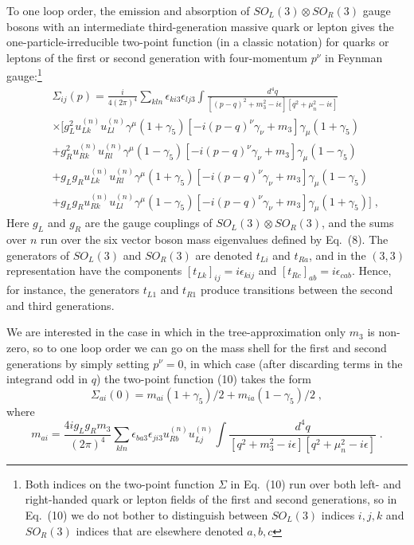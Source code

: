 To one loop order, the emission and absorption of $SO_L(3)\otimes  SO_R(3)$ gauge bosons with an intermediate third-generation massive quark or lepton  gives the one-particle-irreducible  two-point function (in a classic notation) for quarks or leptons of the first or second generation with four-momentum $p^\nu$ in Feynman gauge:\footnote{Both indices on the two-point function $\Sigma$ in Eq.~(10) run over both left- and right-handed quark or lepton fields of the first and second generations, so in Eq.~(10) we do not bother to distinguish between  $SO_L(3)$  indices $i,j,k$ and $SO_R(3)$ indices that are elsewhere denoted $a, b, c$} 
\begin{eqnarray}
&& \Sigma_{ij}(p)=\frac{i}{4(2\pi)^4}\sum_{kln}\epsilon_{ki3}\epsilon_{lj3} \int \frac{d^4q}{[(p-q)^2+m_3^2-i\epsilon][q^2+\mu_n^2-i\epsilon]}\nonumber\\
&& \times \Bigg[g_L^2 u_{Lk}^{(n)}u_{Ll}^{(n)}\gamma^\mu (1+\gamma_5)[-i(p-q)^\nu\gamma_\nu+m_3]\gamma_\mu (1+\gamma_5)\nonumber\\
&&+g_R^2 u_{Rk}^{(n)}u_{Rl}^{(n)}\gamma^\mu(1-\gamma_5)[-i(p-q)^\nu\gamma_\nu+m_3]\gamma_\mu(1-\gamma_5)\nonumber\\
&& +g_L g_Ru_{Lk}^{(n)}u_{Rl}^{(n)}\gamma^\mu (1+\gamma_5)[-i(p-q)^\nu\gamma_\nu+m_3]\gamma_\mu (1-\gamma_5)\nonumber\\
&&+g_Lg_R u_{Rk}^{(n)}u_{Ll}^{(n)} \gamma^\mu (1-\gamma_5)[-i(p-q)^\nu\gamma_\nu+m_3]\gamma_\mu (1+\gamma_5)\Bigg]\;,
\end{eqnarray}
Here $g_L$ and $g_R$ are the gauge couplings of $SO_L(3)\otimes  SO_R(3)$, and 
the sums over $n$ run over the  six vector boson mass eigenvalues defined by Eq.~(8).  The generators of  $SO_L(3)$  and  $SO_R(3)$ are denoted $t_{Li}$ and $t_{Ra}$, and in the $(3,3)$ representation have the components $[t_{Lk}]_{ij}=i\epsilon_{kij}$ and $[t_{Rc}]_{ab}=i\epsilon_{cab}$.  Hence, for instance, the generators 
$t_{L1}$ and $t_{R1}$ produce transitions between the second and third generations.


We are interested in the case  in which in the tree-approximation only $m_3$ is non-zero, so to one loop order we can go on the mass shell for the first and second generations by simply setting $p^\nu=0$, in   which case (after discarding terms in the integrand odd in $q$)  the two-point function (10) takes the form
\begin{equation}
\Sigma_{ai}(0)=m_{ai}(1+\gamma_5)/2+m_{ia}(1-\gamma_5)/2\;,
\end{equation}
where 
\begin{equation}
m_{ai}=\frac{4ig_Lg_Rm_3}{(2\pi)^4}\sum_{kln}\epsilon_{ba3}\epsilon_{ji3}  u_{Rb}^{(n)}u_{Lj}^{(n)} \int \frac{d^4q}{[q^2+m_3^2-i\epsilon][q^2+\mu_n^2-i\epsilon]}\;.
\end{equation}







